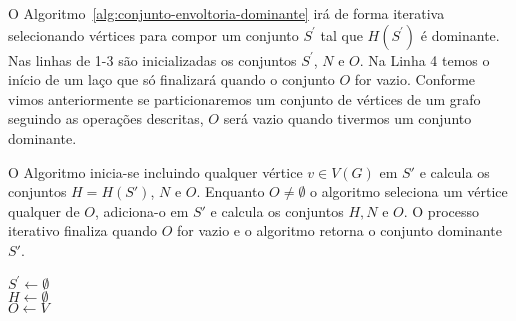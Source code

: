 O Algoritmo~\ref{alg:conjunto-envoltoria-dominante} irá de forma iterativa selecionando vértices para compor um conjunto $S^\prime$ tal que $H(S^\prime)$ é dominante. Nas linhas de 1-3 são inicializadas os conjuntos $S^\prime$, $N$ e $O$. Na Linha 4 temos o início de um laço que só finalizará quando o conjunto $O$ for vazio. Conforme vimos anteriormente se particionaremos um conjunto de vértices de um grafo seguindo as operações descritas, $O$ será vazio quando tivermos um conjunto dominante.

O Algoritmo inicia-se incluindo qualquer vértice $v \in V(G)$ em $S'$ e calcula os conjuntos $H=H(S')$, $N$ e $O$. Enquanto $O \neq \emptyset$ o algoritmo seleciona um vértice qualquer de $O$, adiciona-o em $S'$ e calcula os conjuntos $H, N$ e $O$. O processo iterativo finaliza quando $O$ for vazio e o algoritmo retorna o conjunto dominante $S'$. %


\begin{algorithm2e}[H]
    \SetAlFnt{\tiny}
    \SetAlCapFnt{\small}
    \SetAlCapNameFnt{\small}
    \SetAlgoLined
    \DontPrintSemicolon
    \LinesNumbered
    \SetAlgoLined
    \BlankLine
    \BlankLine
    $S^\prime \gets \emptyset$ \\
    $H \gets \emptyset$ \\
    $O \gets V$ \\
\caption{$ConjuntoFechoDominante(G(V,E))$}
\label{alg:conjunto-envoltoria-dominante}
\end{algorithm2e} 

